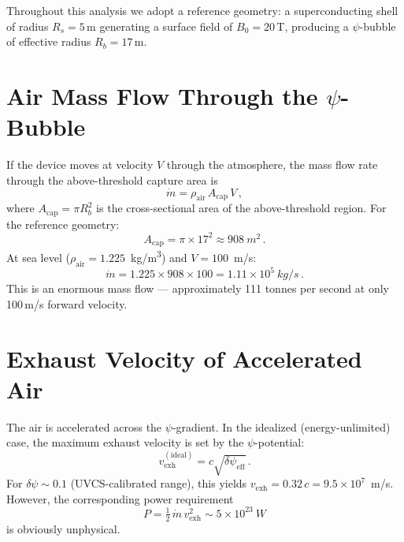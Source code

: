 \documentclass[12pt,twocolumn]{article}
\newcommand{\Reff}{\mathrm{eff}}
\newcommand{\mdot}{\dot{m}}
\newcommand{\vexh}{v_{\mathrm{exh}}}
\begin{document}
Throughout this analysis we adopt a reference geometry: a
superconducting shell of radius $R_s = 5$\,m generating a surface field
of $B_0 = 20$\,T, producing a $\psi$-bubble of effective radius
$R_b = 17$\,m.

\section{Air Mass Flow Through the $\psi$-Bubble}
\label{sec:massflow}

If the device moves at velocity $V$ through the atmosphere, the mass
flow rate through the above-threshold capture area is
\begin{equation}
  \mdot = \rho_\mathrm{air}\,A_\mathrm{cap}\,V\,,
  \label{eq:mdot}
\end{equation}
where $A_\mathrm{cap} = \pi R_b^2$ is the cross-sectional area of the
above-threshold region. For the reference geometry:
\begin{equation}
  A_\mathrm{cap} = \pi \times 17^2 \approx 908~\si{m^2}\,.
\end{equation}
At sea level ($\rho_\mathrm{air} = 1.225$~\si{kg/m^3}) and
$V = 100$~\si{m/s}:
\begin{equation}
  \mdot = 1.225 \times 908 \times 100
        = 1.11 \times 10^5~\si{kg/s}\,.
  \label{eq:mdot-num}
\end{equation}
This is an enormous mass flow --- approximately 111 tonnes per second
at only 100\,m/s forward velocity.

\section{Exhaust Velocity of Accelerated Air}
\label{sec:vexh}

The air is accelerated across the $\psi$-gradient. In the idealized
(energy-unlimited) case, the maximum exhaust velocity is set by the
$\psi$-potential:
\begin{equation}
  \vexh^{(\mathrm{ideal})} = c\sqrt{\delta\psi_\Reff}\,.
  \label{eq:vexh-ideal}
\end{equation}
For $\delta\psi \sim 0.1$ (UVCS-calibrated range), this yields
$\vexh = 0.32\,c = 9.5 \times 10^7$~\si{m/s}. However, the
corresponding power requirement
\begin{equation}
  P = \tfrac{1}{2}\,\mdot\,\vexh^2
    \sim 5 \times 10^{23}~\si{W}
\end{equation}
is obviously unphysical.
\end{document}
